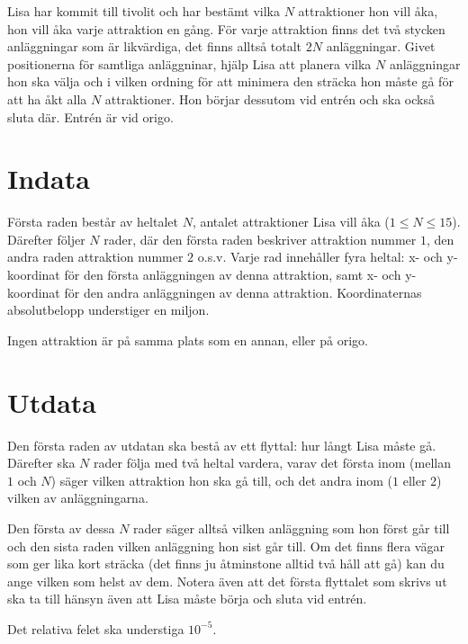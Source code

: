 Lisa har kommit till tivolit och har bestämt vilka $N$ attraktioner hon vill åka, hon vill åka varje attraktion en gång.
För varje attraktion finns det två stycken anläggningar som är likvärdiga, det finns alltså totalt $2N$ anläggningar.
Givet positionerna för samtliga anläggninar, hjälp Lisa att planera vilka $N$ anläggningar hon ska välja och i vilken ordning för att minimera den sträcka hon måste gå för att ha åkt alla $N$ attraktioner.
Hon börjar dessutom vid entrén och ska också sluta där.
Entrén är vid origo.

\section*{Indata}
Första raden består av heltalet $N$, antalet attraktioner Lisa vill åka ($1 \le N \le 15$).
Därefter följer $N$ rader, där den första raden beskriver attraktion nummer $1$, den andra raden attraktion nummer $2$ o.s.v.
Varje rad innehåller fyra heltal: x- och y-koordinat för den första anläggningen av denna attraktion, samt x- och y-koordinat för den andra anläggningen av denna attraktion.
Koordinaternas absolutbelopp understiger en miljon.

Ingen attraktion är på samma plats som en annan, eller på origo.

\section*{Utdata}
Den första raden av utdatan ska bestå av ett flyttal: hur långt Lisa måste gå.
Därefter ska $N$ rader följa med två heltal vardera, varav det första inom (mellan $1$ och $N$) säger vilken attraktion hon ska gå till, och det andra inom ($1$ eller $2$) vilken av anläggningarna.

Den första av dessa $N$ rader säger alltså vilken anläggning som hon först går till och den sista raden vilken anläggning hon sist går till.
Om det finns flera vägar som ger lika kort sträcka (det finns ju åtminstone alltid två håll att gå) kan du ange vilken som helst av dem.
Notera även att det första flyttalet som skrivs ut ska ta till hänsyn även att Lisa måste börja och sluta vid entrén.

Det relativa felet ska understiga $10^{-5}$.
